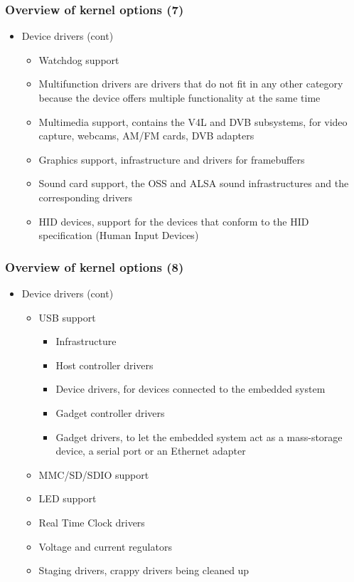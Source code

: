 \begin{frame}
  \frametitle{Overview of kernel options (7)}
  \begin{itemize}
  \item Device drivers (cont)
    \begin{itemize}
    \item Watchdog support
    \item Multifunction drivers are drivers that do not fit in any
      other category because the device offers multiple functionality
      at the same time
    \item Multimedia support, contains the V4L and DVB subsystems, for
      video capture, webcams, AM/FM cards, DVB adapters
    \item Graphics support, infrastructure and drivers for
      framebuffers
    \item Sound card support, the OSS and ALSA sound infrastructures
      and the corresponding drivers
    \item HID devices, support for the devices that conform to the HID
      specification (Human Input Devices)
    \end{itemize}
  \end{itemize}
\end{frame}

\begin{frame}
  \frametitle{Overview of kernel options (8)}
  \begin{itemize}
  \item Device drivers (cont)
    \begin{itemize}
    \item USB support
      \begin{itemize}
      \item Infrastructure
      \item Host controller drivers
      \item Device drivers, for devices connected to the embedded system
      \item Gadget controller drivers
      \item Gadget drivers, to let the embedded system act as a
        mass-storage device, a serial port or an Ethernet adapter
      \end{itemize}
    \item MMC/SD/SDIO support
    \item LED support
    \item Real Time Clock drivers
    \item Voltage and current regulators
    \item Staging drivers, crappy drivers being cleaned up
    \end{itemize}
  \end{itemize}
\end{frame}

